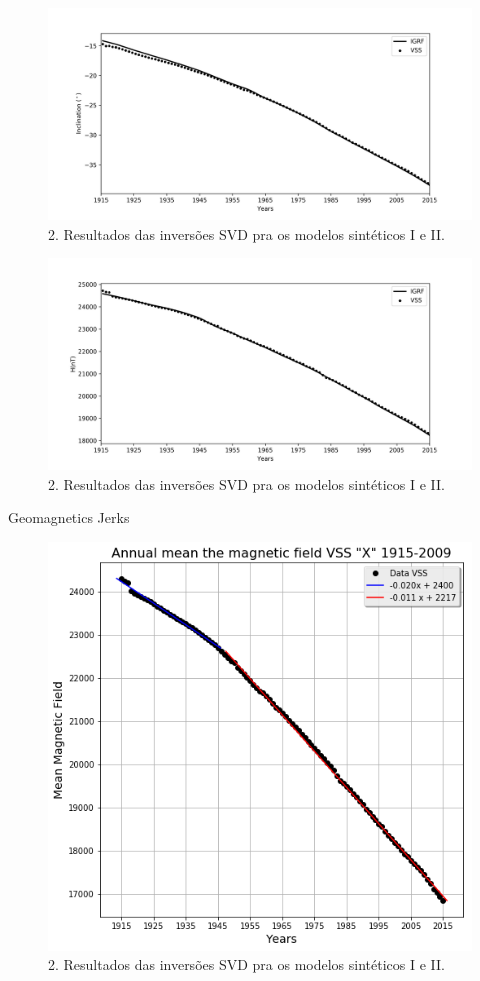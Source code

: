 \documentclass[final,t]{beamer}
\begin{document}
\begin{columns}[t]
\begin{column}{.31\linewidth}
\begin{block}{}
		
		\begin{figure}
			\centering
			\includegraphics[width=1.0\linewidth]{I}
			\caption{2. Resultados das inversões SVD pra os modelos sintéticos I e II.}
			\label{fig:g_Sintetico}
		\end{figure}
	
	
		\begin{figure}
			\centering
			\includegraphics[width=1.0\linewidth]{H}
			\caption{2. Resultados das inversões SVD pra os modelos sintéticos I e II.}
			\label{fig:g_Sintetico}
		\end{figure}
	
\end{block}

\begin{block}{Geomagnetics Jerks}
	\justifying
	
\begin{figure}
	\centering
	\includegraphics[width=0.6\linewidth]{retasX}
	\caption{2. Resultados das inversões SVD pra os modelos sintéticos I e II.}
	\label{fig:g_Sintetico}
\end{figure}	


\end{block}
\end{column}
\end{columns}
\end{document}
